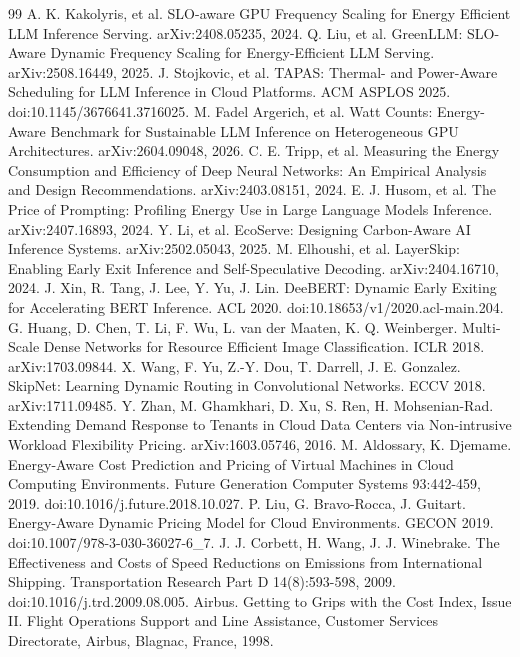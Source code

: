 \documentclass[3p,twocolumn]{elsarticle}
\begin{document}
\begin{thebibliography}{99}
\label{r45} A. K. Kakolyris, et al. SLO-aware GPU Frequency Scaling for Energy Efficient LLM Inference Serving.
arXiv:2408.05235, 2024.
\label{r46} Q. Liu, et al. GreenLLM: SLO-Aware Dynamic Frequency Scaling for Energy-Efficient LLM Serving.
arXiv:2508.16449, 2025.
\label{r47} J. Stojkovic, et al. TAPAS: Thermal- and Power-Aware Scheduling for LLM Inference in Cloud Platforms. ACM
ASPLOS 2025. doi:10.1145/3676641.3716025.
\label{r48} M. Fadel Argerich, et al. Watt Counts: Energy-Aware Benchmark for Sustainable LLM Inference on Heterogeneous
GPU Architectures. arXiv:2604.09048, 2026.
\label{r49} C. E. Tripp, et al. Measuring the Energy Consumption and Efficiency of Deep Neural Networks: An Empirical
Analysis and Design Recommendations. arXiv:2403.08151, 2024.
\label{r50} E. J. Husom, et al. The Price of Prompting: Profiling Energy Use in Large Language Models Inference.
arXiv:2407.16893, 2024.
\label{r51} Y. Li, et al. EcoServe: Designing Carbon-Aware AI Inference Systems. arXiv:2502.05043, 2025.
\label{r52} M. Elhoushi, et al. LayerSkip: Enabling Early Exit Inference and Self-Speculative Decoding. arXiv:2404.16710,
2024.
\label{r53} J. Xin, R. Tang, J. Lee, Y. Yu, J. Lin. DeeBERT: Dynamic Early Exiting for Accelerating BERT Inference. ACL
2020. doi:10.18653/v1/2020.acl-main.204.
\label{r54} G. Huang, D. Chen, T. Li, F. Wu, L. van der Maaten, K. Q. Weinberger. Multi-Scale Dense Networks for
Resource Efficient Image Classification. ICLR 2018. arXiv:1703.09844.
\label{r55} X. Wang, F. Yu, Z.-Y. Dou, T. Darrell, J. E. Gonzalez. SkipNet: Learning Dynamic Routing in Convolutional
Networks. ECCV 2018. arXiv:1711.09485.
\label{r56} Y. Zhan, M. Ghamkhari, D. Xu, S. Ren, H. Mohsenian-Rad. Extending Demand Response to Tenants in Cloud Data
Centers via Non-intrusive Workload Flexibility Pricing. arXiv:1603.05746, 2016.
\label{r57} M. Aldossary, K. Djemame. Energy-Aware Cost Prediction and Pricing of Virtual Machines in Cloud Computing
Environments. Future Generation Computer Systems 93:442-459, 2019. doi:10.1016/j.future.2018.10.027.
\label{r58} P. Liu, G. Bravo-Rocca, J. Guitart. Energy-Aware Dynamic Pricing Model for Cloud Environments. GECON 2019.
doi:10.1007/978-3-030-36027-6\_7.
\label{r59} J. J. Corbett, H. Wang, J. J. Winebrake. The Effectiveness and Costs of Speed Reductions on Emissions from
International Shipping. Transportation Research Part D 14(8):593-598, 2009. doi:10.1016/j.trd.2009.08.005.
\label{r60} Airbus. Getting to Grips with the Cost Index, Issue II. Flight Operations Support and Line Assistance,
Customer Services Directorate, Airbus, Blagnac, France, 1998.
\end{thebibliography}
\end{document}

